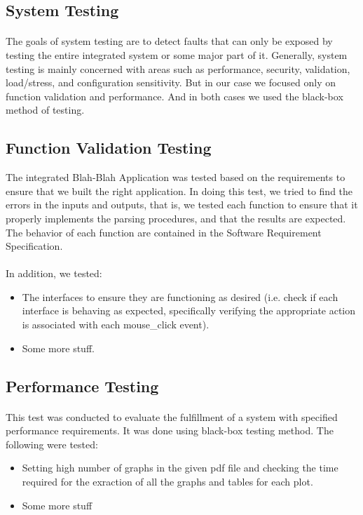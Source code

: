 \documentclass[a4paper,10pt]{scrreprt}
\begin{document}
\subsection{System Testing}
\paragraph{}
The goals of system testing are to detect faults that can only be exposed by testing the entire integrated system or some major part of it. Generally, system testing is mainly concerned with areas such as performance, security, validation, load/stress, and configuration sensitivity. But in our case we focused only on function validation and performance. And in both cases we used the black-box method of testing.
\subsection{Function Validation Testing}
The integrated Blah-Blah Application was tested based on the requirements to ensure that we built the right application. In doing this test, we tried to find the errors in the inputs and outputs, that is, we tested each function to ensure that it properly implements the parsing procedures, and that the results are expected. The behavior of each function are contained in the Software Requirement Specification.
\paragraph{}
In addition, we tested:
\begin{itemize}
	\item The interfaces to ensure they are functioning as desired (i.e. check if each interface is behaving as expected, specifically verifying the appropriate action is associated with each mouse_click event).
	\item Some more stuff.
\end{itemize}
\subsection{Performance Testing}
\paragraph{}
This test was conducted to evaluate the fulfillment of a system with specified performance requirements. It was done using black-box testing method. The following were tested:
\begin{itemize}
	\item Setting high number of graphs in the given pdf file and checking the time required for the exraction of all the graphs and tables for each plot.
	\item Some more stuff
\end{itemize}
\end{document}
